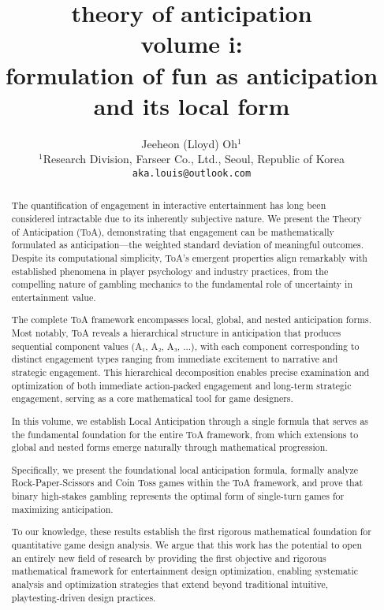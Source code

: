 \documentclass{article}
\title{\textbf{theory of anticipation}\\[3mm] 
       \large volume i:\\[2mm]
       formulation of fun as anticipation and its local form}
\author{Jeeheon (Lloyd) Oh$^{1}$\\
\small{$^{1}$Research Division, Farseer Co., Ltd., Seoul, Republic of Korea}\\
\small{\texttt{aka.louis@outlook.com}}
}
\begin{document}
\maketitle

\begin{abstract}

The quantification of engagement in interactive entertainment has long been considered intractable due to its inherently subjective nature. We present the Theory of Anticipation (ToA), demonstrating that engagement can be mathematically formulated as anticipation—the weighted standard deviation of meaningful outcomes. Despite its computational simplicity, ToA's emergent properties align remarkably with established phenomena in player psychology and industry practices, from the compelling nature of gambling mechanics to the fundamental role of uncertainty in entertainment value.

The complete ToA framework encompasses local, global, and nested anticipation forms. Most notably, ToA reveals a hierarchical structure in anticipation that produces sequential component values (A₁, A₂, A₃, ...), with each component corresponding to distinct engagement types ranging from immediate excitement to narrative and strategic engagement. This hierarchical decomposition enables precise examination and optimization of both immediate action-packed engagement and long-term strategic engagement, serving as a core mathematical tool for game designers.

In this volume, we establish Local Anticipation through a single formula that serves as the fundamental foundation for the entire ToA framework, from which extensions to global and nested forms emerge naturally through mathematical progression.

Specifically, we present the foundational local anticipation formula, formally analyze Rock-Paper-Scissors and Coin Toss games within the ToA framework, and prove that binary high-stakes gambling represents the optimal form of single-turn games for maximizing anticipation.

To our knowledge, these results establish the first rigorous mathematical foundation for quantitative game design analysis. We argue that this work has the potential to open an entirely new field of research by providing the first objective and rigorous mathematical framework for entertainment design optimization, enabling systematic analysis and optimization strategies that extend beyond traditional intuitive, playtesting-driven design practices.

\end{abstract}
\end{document}
